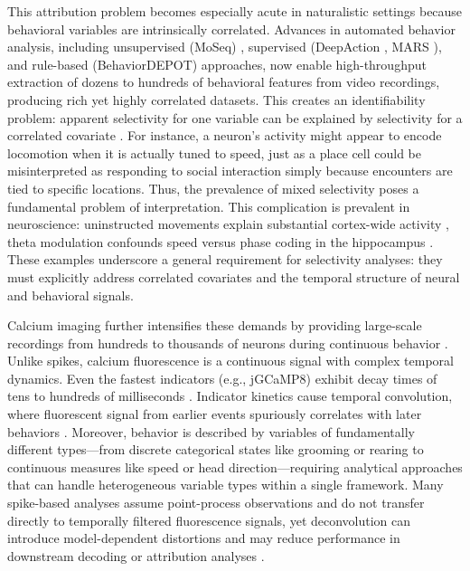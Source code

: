 This attribution problem becomes especially acute in naturalistic settings because behavioral variables are intrinsically correlated.  Advances in automated behavior analysis, including unsupervised (MoSeq) \cite{Weinreb2024}, supervised (DeepAction \cite{Harris2023deepaction}, MARS \cite{Segalin2021}), and rule-based (BehaviorDEPOT) \cite{Gabriel2022} approaches, now enable high-throughput extraction of dozens to hundreds of behavioral features from video recordings, producing rich yet highly correlated datasets. This creates an identifiability problem: apparent selectivity for one variable can be explained by selectivity for a correlated covariate . For instance, a neuron's activity might appear to encode locomotion when it is actually tuned to speed, just as a place cell could be misinterpreted as responding to social interaction simply because encounters are tied to specific locations. Thus, the prevalence of mixed selectivity poses a fundamental problem of interpretation. This complication is prevalent in neuroscience: uninstructed movements explain substantial cortex-wide activity \cite{Musall2019}, theta modulation confounds speed versus phase coding in the hippocampus \cite{Vanderwolf1969, McNaughton1983}. These examples underscore a general requirement for selectivity analyses: they must explicitly address correlated covariates and the temporal structure of neural and behavioral signals. 

Calcium imaging further intensifies these demands by providing large-scale recordings from hundreds to thousands of neurons during continuous behavior  \cite{Chen2013, Zong2022}. Unlike spikes, calcium fluorescence is a continuous signal with complex temporal dynamics. Even the fastest indicators (e.g., jGCaMP8) exhibit decay times of tens to hundreds of milliseconds \cite{Zhang2023}. Indicator kinetics cause temporal convolution, where fluorescent signal from earlier events spuriously correlates with later behaviors \cite{Wei2020}. Moreover, behavior is described by variables of fundamentally different types---from discrete categorical states like grooming or rearing to continuous measures like speed or head direction---requiring analytical approaches that can handle heterogeneous variable types within a single framework. Many spike-based analyses assume point-process observations and do not transfer directly to temporally filtered fluorescence signals, yet deconvolution can introduce model-dependent distortions and may reduce performance in downstream decoding or attribution analyses  \cite{Rupprecht2021}.


